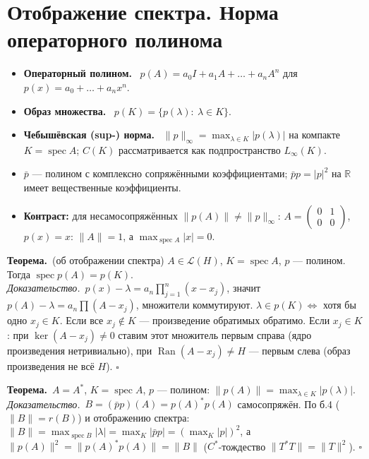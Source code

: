 \documentclass[11pt,a4paper]{article}
\newcommand{\Lc}{\mathcal L}
\newcommand{\RR}{\mathbb R}
\newcommand{\spec}{\operatorname{spec}}
\newcommand{\Ran}{\operatorname{Ran}}
\newcommand{\df}[1]{\textbf{#1.}~}
\newcommand{\thm}{\textbf{Теорема.}~}
\newcommand{\pf}{\textit{Доказательство.}~}
\newcommand{\qedd}{\hfill$\square$}
\begin{document}
\section{Отображение спектра. Норма операторного полинома}
\begin{defs}
\begin{itemize}
\item \df{Операторный полином} $p(A)=a_0I+a_1A+\dots+a_nA^n$ для $p(x)=a_0+\dots+a_nx^n$.
\item \df{Образ множества} $p(K)=\{p(\lambda):\ \lambda\in K\}$.
\item \df{Чебышёвская (sup-) норма} $\|p\|_\infty=\max_{\lambda\in K}|p(\lambda)|$ на компакте $K=\spec A$; $C(K)$ рассматривается как подпространство $L_\infty(K)$.
\item $\bar p$ — полином с комплексно сопряжёнными коэффициентами; $\bar pp=|p|^2$ на $\RR$ имеет вещественные коэффициенты.
\item \textbf{Контраст:} для несамосопряжённых $\|p(A)\|\ne\|p\|_\infty$: $A=\begin{pmatrix}0&1\\0&0\end{pmatrix}$, $p(x)=x$: $\|A\|=1$, а $\max_{\spec A}|x|=0$.
\end{itemize}
\end{defs}

\thm (об отображении спектра) $A\in\Lc(H)$, $K=\spec A$, $p$ — полином. Тогда $\spec p(A)=p(K)$.\\
\pf $p(x)-\lambda=a_n\prod_{j=1}^n(x-x_j)$, значит $p(A)-\lambda=a_n\prod(A-x_j)$, множители коммутируют. $\lambda\in p(K)\iff$ хотя бы одно $x_j\in K$. Если все $x_j\notin K$ — произведение обратимых обратимо. Если $x_j\in K$: при $\ker(A-x_j)\ne0$ ставим этот множитель первым справа (ядро произведения нетривиально), при $\Ran(A-x_j)\ne H$ — первым слева (образ произведения не всё $H$). \qedd

\thm $A=A^*$, $K=\spec A$, $p$ — полином: $\|p(A)\|=\max_{\lambda\in K}|p(\lambda)|$.\\
\pf $B=(\bar pp)(A)=p(A)^*p(A)$ самосопряжён. По б.4 ($\|B\|=r(B)$) и отображению спектра: $\|B\|=\max_{\spec B}|\lambda|=\max_K|\bar pp|=(\max_K|p|)^2$, а $\|p(A)\|^2=\|p(A)^*p(A)\|=\|B\|$ ($C^*$-тождество $\|T^*T\|=\|T\|^2$). \qedd
\end{document}
